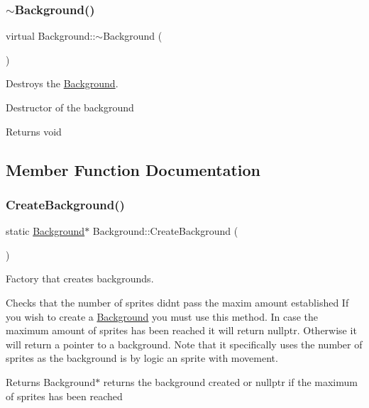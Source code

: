 \subsubsection{\texorpdfstring{$\sim$\+Background()}{~Background()}}
{\footnotesize\ttfamily virtual Background\+::$\sim$\+Background (\begin{DoxyParamCaption}{ }\end{DoxyParamCaption})\hspace{0.3cm}{\ttfamily [virtual]}}



Destroys the \hyperlink{class_background}{Background}. 

Destructor of the background

\begin{DoxyReturn}{Returns}
void 
\end{DoxyReturn}


\subsection{Member Function Documentation}
\mbox{\label{class_background_aafc5996195781b2d4bff7d170792425d}} 
\subsubsection{\texorpdfstring{Create\+Background()}{CreateBackground()}}
{\footnotesize\ttfamily static \hyperlink{class_background}{Background}$\ast$ Background\+::\+Create\+Background (\begin{DoxyParamCaption}{ }\end{DoxyParamCaption})\hspace{0.3cm}{\ttfamily [static]}}



Factory that creates backgrounds. 

Checks that the number of sprites didn\textquotesingle{}t pass the maxim amount established If you wish to create a \hyperlink{class_background}{Background} you must use this method. In case the maximum amount of sprites has been reached it will return nullptr. Otherwise it will return a pointer to a background. Note that it specifically uses the number of sprites as the background is by logic an sprite with movement.

\begin{DoxyReturn}{Returns}
Background$\ast$ returns the background created or nullptr if the maximum of sprites has been reached 
\end{DoxyReturn}
\mbox{\label{class_background_a257183f6d077bbee005760813dbb0592}} 
